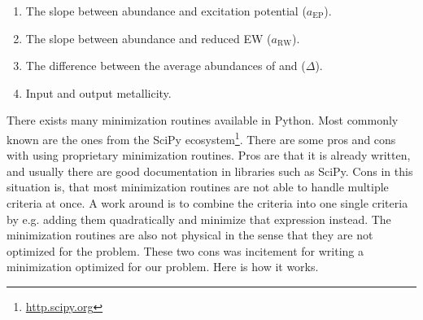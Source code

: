 \documentclass{aa}
\begin{document}
\begin{enumerate}
    \item The slope between abundance and excitation potential ($a_\mathrm{EP}$).
    \item The slope between abundance and reduced EW ($a_\mathrm{RW}$).
    \item The difference between the average abundances of  and
           ($\Delta$).
    \item Input and output metallicity.
\end{enumerate}

There exists many minimization routines available in Python. Most commonly
known are the ones from the SciPy ecosystem\footnote{\url{http.scipy.org}}.
There are some pros and cons with using proprietary minimization routines.
Pros are that it is already written, and usually there are good documentation
in libraries such as SciPy. Cons in this situation is, that most minimization
routines are not able to handle multiple criteria at once. A work around is
to combine the criteria into one single criteria by e.g. adding them
quadratically and minimize that expression instead. The minimization routines
are also not physical in the sense that they are not optimized for the problem.
These two cons was incitement for writing a minimization optimized for our
problem. Here is how it works.
\end{document}
